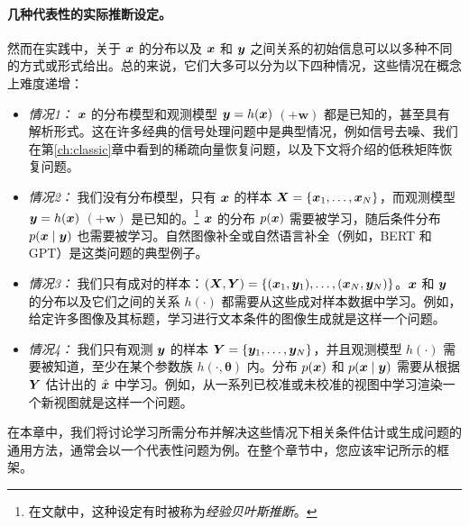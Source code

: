 \documentclass[../../book-main_zh.tex]{subfiles}
\begin{document}
\paragraph{几种代表性的实际推断设定。} 
然而在实践中，关于 $\bm{x}$ 的分布以及 $\bm{x}$ 和 $\bm{y}$ 之间关系的初始信息可以以多种不同的方式或形式给出。总的来说，它们大多可以分为以下四种情况，这些情况在概念上难度递增：
\begin{itemize}
\item {\em 情况1：} $\bm{x}$ 的分布模型和观测模型 $\bm{y} = h(\bm{x})$ $(+ \boldsymbol{w})$ 都是已知的，甚至具有解析形式。这在许多经典的信号处理问题中是典型情况，例如信号去噪、我们在第\ref{ch:classic}章中看到的稀疏向量恢复问题，以及下文将介绍的低秩矩阵恢复问题。
\item {\em 情况2：} 我们没有分布模型，只有 $\bm{x}$ 的样本 $\bm{X} = \{\bm{x}_1, \ldots, \bm{x}_N\}$，而观测模型 $\bm{y} = h(\bm{x})$ $ (+ \boldsymbol{w})$ 是已知的。\footnote{在文献中，这种设定有时被称为{\em 经验贝叶斯推断}。} $\bm{x}$ 的分布 $p(\bm{x})$ 需要被学习，随后条件分布 $p(\bm{x}\mid \bm{y})$ 也需要被学习。自然图像补全或自然语言补全（例如，BERT 和 GPT）是这类问题的典型例子。
\item {\em 情况3：} 我们只有成对的样本：$(\bm{X}, \bm{Y}) = \{ (\bm{x}_1, \bm{y}_1), \ldots, (\bm{x}_N, \bm{y}_N) \}$。$\bm{x}$ 和 $\bm{y}$ 的分布以及它们之间的关系 $h(\cdot)$ 都需要从这些成对样本数据中学习。例如，给定许多图像及其标题，学习进行文本条件的图像生成就是这样一个问题。
\item {\em 情况4：} 我们只有观测 $\bm{y}$ 的样本 $\bm{Y} = \{\bm{y}_1, \ldots, \bm{y}_N\}$，并且观测模型 $h(\cdot)$ 需要被知道，至少在某个参数族 $h(\cdot, \boldsymbol{\theta})$ 内。分布 $p(\bm{x})$ 和 $p(\bm{x} \mid \bm{y})$ 需要从根据 $\bm{Y}$ 估计出的 $\hat {\bm{x}}$ 中学习。例如，从一系列已校准或未校准的视图中学习渲染一个新视图就是这样一个问题。
\end{itemize}
在本章中，我们将讨论学习所需分布并解决这些情况下相关条件估计或生成问题的通用方法，通常会以一个代表性问题为例。在整个章节中，您应该牢记所示的框架。

\end{document}
